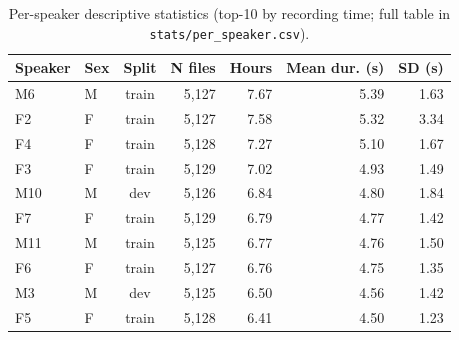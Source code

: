 \begin{table}[!t]
  \centering
  \caption{Per-speaker descriptive statistics (top-10 by recording
           time; full table in \texttt{stats/per\_speaker.csv}).}
  \label{tab:per_speaker}
  \small
  \begin{tabular}{llcrrrr}
  \toprule
  Speaker & Sex & Split & N files & Hours & Mean dur. (s) & SD (s) \\
  \midrule
  M6  & M & train & 5{,}127 & 7.67 & 5.39 & 1.63 \\
  F2 & F & train & 5{,}127 & 7.58 & 5.32 & 3.34 \\
  F4 & F & train & 5{,}128 & 7.27 & 5.10 & 1.67 \\
  F3   & F & train & 5{,}129 & 7.02 & 4.93 & 1.49 \\
  M10  & M & dev   & 5{,}126 & 6.84 & 4.80 & 1.84 \\
  F7 & F & train & 5{,}129 & 6.79 & 4.77 & 1.42 \\
  M11 & M & train & 5{,}125 & 6.77 & 4.76 & 1.50 \\
  F6 & F & train & 5{,}127 & 6.76 & 4.75 & 1.35 \\
  M3  & M & dev   & 5{,}125 & 6.50 & 4.56 & 1.42 \\
  F5 & F & train & 5{,}128 & 6.41 & 4.50 & 1.23 \\
  \bottomrule
  \end{tabular}
\end{table}
